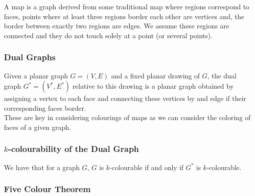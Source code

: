 A map is a graph derived from some traditional map where regions correspond to faces,
points where at least three regions border each other are vertices and, the border between
exactly two regions are edges. We assume these regions are connected and they do not touch
solely at a point (or several points).

\subsubsection{Dual Graphs}

Given a planar graph $G = (V, E)$ and a fixed planar drawing of $G$, the dual graph
$G^* = (V^*, E^*)$ relative to this drawing is a planar graph obtained by assigning
a vertex to each face and connecting these vertices by and edge if their corresponding
faces border.
\\[\baselineskip]
These are key in considering colourings of maps as we can consider the coloring
of faces of a given graph.

\subsubsection{$k$-colourability of the Dual Graph}

We have that for a graph $G$, $G$ is $k$-colourable if and only if $G^*$ is 
$k$-colourable. 

\subsubsection{Five Colour Theorem}

